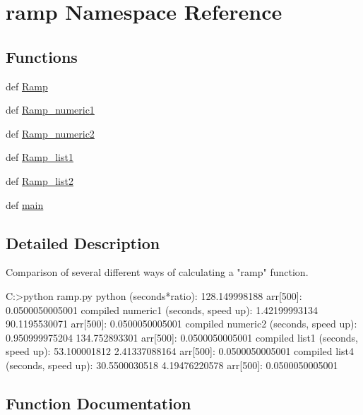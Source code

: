\hypertarget{namespaceramp}{}\section{ramp Namespace Reference}
\label{namespaceramp}
\subsection*{Functions}
\begin{DoxyCompactItemize}
\item 
def \hyperlink{namespaceramp_a46d153cd413c969703ef537808b9d65c}{Ramp}
\item 
def \hyperlink{namespaceramp_a861bd413623e812af92d1c91cdcf2415}{Ramp\+\_\+numeric1}
\item 
def \hyperlink{namespaceramp_a8dc842fa4499fdf4fcea3aa60bc0109e}{Ramp\+\_\+numeric2}
\item 
def \hyperlink{namespaceramp_a150ebe08788aa8c26e26b65c72c5ab62}{Ramp\+\_\+list1}
\item 
def \hyperlink{namespaceramp_a1b82b6351163523f5f95ea1f2c89329f}{Ramp\+\_\+list2}
\item 
def \hyperlink{namespaceramp_ae9c57d273ba806e0fcb269885c33586f}{main}
\end{DoxyCompactItemize}


\subsection{Detailed Description}
\begin{DoxyVerb}Comparison of several different ways of calculating a "ramp"
function.

C:\home\ej\wrk\junk\scipy\weave\examples>python ramp.py
python (seconds*ratio): 128.149998188
arr[500]: 0.0500050005001
compiled numeric1 (seconds, speed up): 1.42199993134 90.1195530071
arr[500]: 0.0500050005001
compiled numeric2 (seconds, speed up): 0.950999975204 134.752893301
arr[500]: 0.0500050005001
compiled list1 (seconds, speed up): 53.100001812 2.41337088164
arr[500]: 0.0500050005001
compiled list4 (seconds, speed up): 30.5500030518 4.19476220578
arr[500]: 0.0500050005001\end{DoxyVerb}
 

\subsection{Function Documentation}
\hypertarget{namespaceramp_ae9c57d273ba806e0fcb269885c33586f}{}
